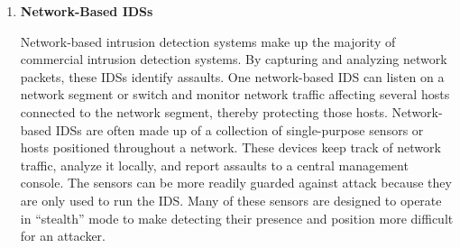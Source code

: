 \documentclass[12pt]{article}
\begin{document}
    \begin{enumerate}
        \item \textbf{Network-Based IDSs}
        \par Network-based intrusion detection systems make up the majority of commercial intrusion detection systems. By capturing and analyzing network packets, these IDSs identify assaults. One network-based IDS can listen on a network segment or switch and monitor network traffic affecting several hosts connected to the network segment, thereby protecting those hosts. Network-based IDSs are often made up of a collection of single-purpose sensors or hosts positioned throughout a network. These devices keep track of network traffic, analyze it locally, and report assaults to a central management console. The sensors can be more readily guarded against attack because they are only used to run the IDS. Many of these sensors are designed to operate in “stealth” mode to make detecting their presence and position more difficult for an attacker.
        

\end{enumerate}
\end{document}
